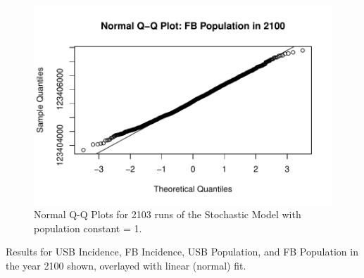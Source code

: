 \documentclass{amsart}
\begin{document}
\begin{figure}
    \includegraphics[scale=0.4]{figures/qqnormFBPop.pdf}
  \caption{Normal Q-Q Plots for 2103 runs of the Stochastic Model with population constant = 1.}
  \label{fig:qqnormPlots}
\end{figure}

Results for USB Incidence, FB Incidence, USB Population, and FB Population in the year
2100 shown, overlayed with linear (normal) fit.
\end{document}

